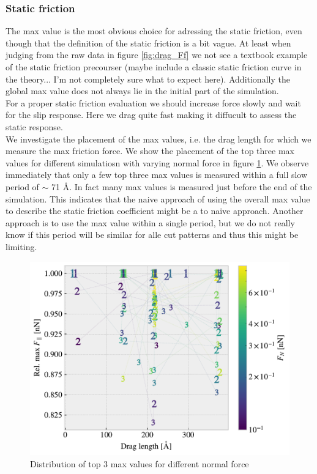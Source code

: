 \subsubsection{Static friction} 
The max value is the most obvious choice for adressing the static friction, even though that the definition of the static friction is a bit vague. At least when judging from the raw data in figure \ref{fig:drag_Ff} we not see a textbook example of the static friction precourser  (maybe include a classic static friction curve in the theory... I'm not completely sure what to expect here). Additionally the global max value does not always lie in the initial part of the simulation. \\
For a proper static friction evaluation we should increase force slowly and wait for the slip response. Here we drag quite fast making it diffucult to assess the static response. \\
We investigate the placement of the max values, i.e. the drag length for which we measure the max friction force. We show the placement of the top three max values for different simulatiosn with varying normal force in figure \ref{fig:max_dist}. We observe immediately that only a few top three max values is measured within a full slow period of $\sim$ 71 Å. In fact many max values is measured just before the end of the simulation. This indicates that the naive approach of using the overall max value to describe the static friction coefficient might be a to naive approach. Another approach is to use the max value within a single period, but we do not really know if this period will be similar for alle cut patterns and thus this might be limiting. 

\begin{figure}[H]
  \centering
  \includegraphics[width=0.6\linewidth]{figures/baseline/max_dist.pdf}
  \caption{Distribution of top 3 max values for different normal force}
  \label{fig:max_dist}
\end{figure}


